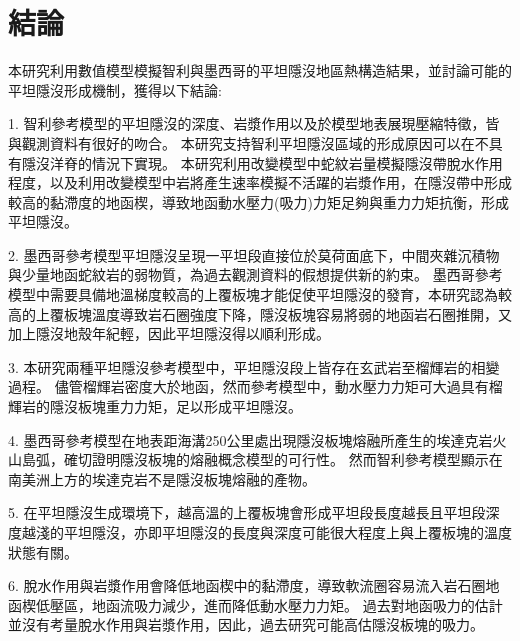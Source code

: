 
\chapter{結論}

本研究利用數值模型模擬智利與墨西哥的平坦隱沒地區熱構造結果，並討論可能的平坦隱沒形成機制，獲得以下結論:

1. 智利參考模型的平坦隱沒的深度、岩漿作用以及於模型地表展現壓縮特徵，皆與觀測資料有很好的吻合。
本研究支持智利平坦隱沒區域的形成原因可以在不具有隱沒洋脊的情況下實現。
本研究利用改變模型中蛇紋岩量模擬隱沒帶脫水作用程度，以及利用改變模型中岩將產生速率模擬不活躍的岩漿作用，在隱沒帶中形成較高的黏滯度的地函楔，導致地函動水壓力(吸力)力矩足夠與重力力矩抗衡，形成平坦隱沒。

2. 墨西哥參考模型平坦隱沒呈現一平坦段直接位於莫荷面底下，中間夾雜沉積物與少量地函蛇紋岩的弱物質，為過去觀測資料的假想提供新的約束。
墨西哥參考模型中需要具備地溫梯度較高的上覆板塊才能促使平坦隱沒的發育，本研究認為較高的上覆板塊溫度導致岩石圈強度下降，隱沒板塊容易將弱的地函岩石圈推開，又加上隱沒地殼年紀輕，因此平坦隱沒得以順利形成。

3. 本研究兩種平坦隱沒參考模型中，平坦隱沒段上皆存在玄武岩至榴輝岩的相變過程。
儘管榴輝岩密度大於地函，然而參考模型中，動水壓力力矩可大過具有榴輝岩的隱沒板塊重力力矩，足以形成平坦隱沒。


4. 墨西哥參考模型在地表距海溝250公里處出現隱沒板塊熔融所產生的埃達克岩火山島弧，確切證明隱沒板塊的熔融概念模型的可行性。
然而智利參考模型顯示在南美洲上方的埃達克岩不是隱沒板塊熔融的產物。

5. 在平坦隱沒生成環境下，越高溫的上覆板塊會形成平坦段長度越長且平坦段深度越淺的平坦隱沒，亦即平坦隱沒的長度與深度可能很大程度上與上覆板塊的溫度狀態有關。

6. 脫水作用與岩漿作用會降低地函楔中的黏滯度，導致軟流圈容易流入岩石圈地函楔低壓區，地函流吸力減少，進而降低動水壓力力矩。
過去對地函吸力的估計並沒有考量脫水作用與岩漿作用，因此，過去研究可能高估隱沒板塊的吸力。